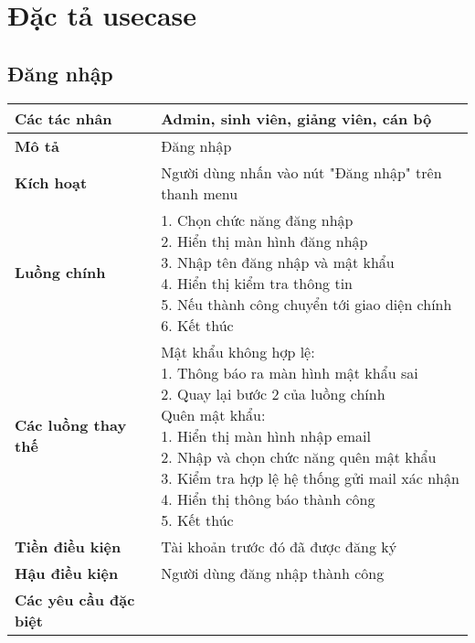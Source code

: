 \section{Đặc tả usecase}
	\subsection*{Đăng nhập}
		\begin{tabular}{|l|p{}|}
			\hline
			\textbf{Các tác nhân}         & Admin, sinh viên, giảng viên, cán bộ \\
			\hline
			\textbf{Mô tả}                & Đăng nhập                                           \\
			\hline
			\textbf{Kích hoạt}            & Người dùng nhấn vào nút "Đăng nhập" trên thanh menu \\
			\hline
			\textbf{Luồng chính}          & \makecell[l]{1. Chọn chức năng đăng nhập            \\ 2. Hiển thị màn hình đăng nhập \\ 3. Nhập tên đăng nhập và mật khẩu \\ 4. Hiển thị kiểm tra thông tin \\ 5. Nếu thành công chuyển tới giao diện chính \\ 6. Kết thúc} \\
			\hline
			\textbf{Các luồng thay thế}   & \makecell[l]{Mật khẩu không hợp lệ:                 \\ 1. Thông báo ra màn hình mật khẩu sai \\ 2. Quay lại bước 2 của luồng chính \\ Quên mật khẩu: \\ 1. Hiển thị màn hình nhập email \\ 2. Nhập và chọn chức năng quên mật khẩu \\ 3. Kiểm tra hợp lệ hệ thống gửi mail xác nhận \\ 4. Hiển thị thông báo thành công \\ 5. Kết thúc} \\
			\hline
			\textbf{Tiền điều kiện}       & Tài khoản trước đó đã được đăng ký                  \\
			\hline
			\textbf{Hậu điều kiện}        & Người dùng đăng nhập thành công                     \\
			\hline
			\textbf{Các yêu cầu đặc biệt} &                                                     \\
			\hline
		\end{tabular}

